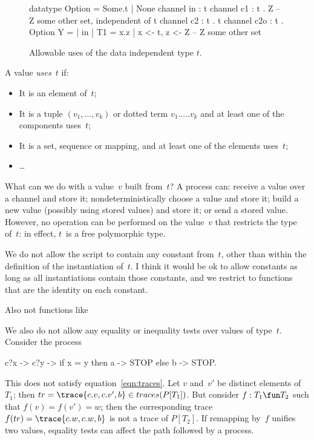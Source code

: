 
\begin{figure}[th]
\begin{cspm}
datatype Option = Some.t | None
channel in : t
channel c1 : t . Z -- Z some other set, independent of t
channel c2 : t . t
channel c2o : t . Option
Y = {| in |}
T1 = { x.z | x <- t, z <- Z } -- Z some other set
\end{cspm}
\caption{Allowable uses of the data independent type $t$. \label{fig:t-allowed}}
\end{figure}


\begin{definition}
A value \emph{uses}~$t$ if:
\begin{itemize}
\item It is an element of~$t$;

\item It is a tuple $(v_1,\ldots,v_k)$ or dotted term $v_1.\ldots.v_k$ and at
least one of the components uses~$t$;

\item It is a set, sequence or mapping, and at least one of the elements
uses~$t$; 

\item \ldots
\end{itemize}
\end{definition}


What can we do with a value~$v$ built from~$t$?  A process can: receive a
value over a channel and store it; nondeterministically choose a value and
store it; build a new value (possibly using stored values) and store it; or
send a stored value.  However, no operation can be performed on the value~$v$
that restricts the type of~$t$: in effect, $t$~is a free polymorphic type.

We do not allow the script to contain any constant from~$t$, other than within
the definition of the instantiation of~$t$.  \framebox{**} I
think it would be ok to allow constants as long as all instantiations contain
those constants, and we restrict to functions that are the identity on each
constant. 

Also not functions like  \framebox{\ldots}

We also do not allow any equality or inequality tests over values of type~$t$.
Consider the process
\begin{cspm}
c?x -> c?y -> if x = y then a -> STOP else b -> STOP.
\end{cspm}
%
This does not satisfy equation~\ref{eqn:traces}.  Let $v$ and~$v'$ be distinct
elements of~$T_1$; then $tr = \trace{c.v, c.v', b} \in traces(P[T_1])$.  But
consider $f: T_1 \fun T_2$ such that $f(v) = f(v') = w$; then the
corresponding trace $f(tr) = \trace{c.w, c.w, b}$ is not a trace of
$P[T_2]$.  If remapping by~$f$ unifies two values, equality tests can affect
the path followed by a process. 

